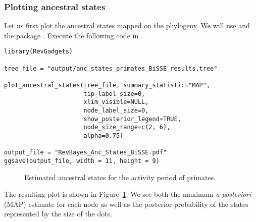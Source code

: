 \subsubsection{Plotting ancestral states}

Let us first plot the ancestral states mapped on the phylogeny.
We will use \R and the package \RevGadgets.
Execute the following code in \R.
{\tt \begin{snugshade*}
\begin{lstlisting}
library(RevGadgets)

tree_file = "output/anc_states_primates_BiSSE_results.tree"

plot_ancestral_states(tree_file, summary_statistic="MAP",
                      tip_label_size=0,
                      xlim_visible=NULL,
                      node_label_size=0,
                      show_posterior_legend=TRUE,
                      node_size_range=c(2, 6),
                      alpha=0.75)

output_file = "RevBayes_Anc_States_BiSSE.pdf"
ggsave(output_file, width = 11, height = 9)
\end{lstlisting}
\end{snugshade*}}
\begin{figure}[h!]
\centering
{}
\caption{\small Estimated ancestral states for the activity period of primates.}
\label{fig:anc_states_BiSSE}
\end{figure}
The resulting plot is shown in Figure~\ref{fig:anc_states_BiSSE}.
We see both the maximum \emph{a posteriori} (MAP) estimate for each node as well as the posterior probability of the states represented by the size of the dots.


